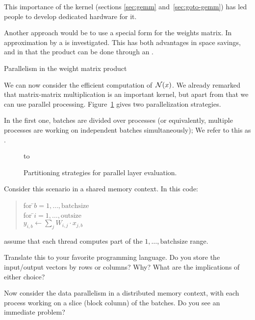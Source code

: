 This importance of the  kernel
(sections \ref{sec:gemm} and~\ref{sec:goto-gemm})
has led people
to develop dedicated hardware for it.

Another approach would be to use a special form for the weights matrix.
In~\cite{Liao2019CompressingDN} approximation
by a  is investigated.
This has both advantages in space savings,
and in that the product can be done through an .

 {Parallelism in the weight matrix product}

We can now consider the efficient computation of~${\cal N} (x)$.
We already remarked that matrix-matrix multiplication
is an important kernel, but apart from that we can use
parallel processing.
Figure~\ref{fig:layershape-par} gives two parallelization strategies.

In the first one, batches are divided over processes
(or equivalently, multiple processes are working on
independent batches simultaneously);
We refer to this as .

\begin{figure}[ht]
  \hbox to 
  \caption{Partitioning strategies for parallel layer evaluation.}
  \label{fig:layershape-par}
\end{figure}

\begin{exercise}
  Consider this scenario in a shared memory context. In this code:
  \begin{quote}
    \begin{tabbing}
      for \=$b=1,\ldots,\mathrm{batchsize}$\\
      \> for \=$i=1,\ldots,\mathrm{outsize}$\\
      \> \> $y_{i,b} \leftarrow \sum_j W_{i,j}\cdot x_{j,b}$\\
    \end{tabbing}
  \end{quote}
  assume that each thread computes part of the $1,\ldots,\mathrm{batchsize}$ range.

  Translate this to your favorite programming language.
  Do you store the input/output vectors by rows or columns? Why?
  What are the implications of either choice?
\end{exercise}

\begin{exercise}
  Now consider the data parallelism in a distributed memory context,
  with each process working on a slice (block column) of the batches.
  Do you see an immediate problem?
\end{exercise}


